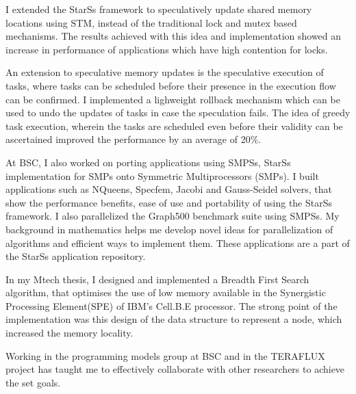 \documentclass[10pt,stdletter,dateno]{newlfm}
\begin{document}
\begin{newlfm}
%
	   \par
	   I extended the StarSs framework to speculatively update shared memory locations using STM, instead of the traditional lock and mutex based mechanisms.
	   The results achieved with this idea and implementation showed an increase in performance of applications which have high contention for locks. 
%
	   \par
	   An extension to speculative memory updates is the speculative execution of tasks, where tasks can be scheduled before their presence in the execution flow can be confirmed.
	   I implemented a lighweight rollback mechanism which can be used to undo the updates of tasks in case the speculation fails.
	   The idea of greedy task execution, wherein the tasks are scheduled even before their validity can be ascertained improved the performance by an average of 20\%. 
%
	   \par
	   At BSC, I also worked on porting applications using SMPSs, StarSs implementation for SMPs onto Symmetric Multiprocessors (SMPs).
	   I built applications such as NQueens, Specfem, Jacobi and Gauss-Seidel solvers, that show the performance benefits, ease of use and portability of using the StarSs framework. 
	   I also parallelized the Graph500 benchmark suite using SMPSs.
	   My background in mathematics helps me develop novel ideas for parallelization of algorithms and efficient ways to implement them. 
	   These applications are a part of the StarSs application repository. 
%
	   \par
	   In my Mtech thesis, I designed and implemented a Breadth First Search algorithm, that optimises the use of low memory available in the Synergistic Processing Element(SPE) of IBM's Cell.B.E processor. 
	   The strong point of the implementation was this design of the data structure to represent a node, which increased the memory locality.
%
	   \par
	   Working in the programming models group at BSC and in the TERAFLUX project has taught me to effectively collaborate with other researchers to achieve the set goals.

\end{newlfm}
\end{document}
